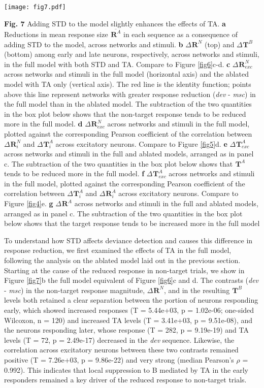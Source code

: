 \documentclass[pdflatex,referee,iicol,sn-basic]{sn-jnl}
\newcommand{\dev}{\textit{dev}}
\newcommand{\msc}{\textit{msc}}
\renewcommand{\R}[3][]{{}^{#1}_{}\!\mathbf{R}^{#2}_{#3}}
\renewcommand{\T}[3][]{{}^{#1}_{}\mathbf{T}^{#2}_{#3}}
\newcommand{\mean}[1]{\overline{#1}}
\theoremstyle{thmstyleone}%
\theoremstyle{thmstyletwo}%
\theoremstyle{thmstylethree}%
\begin{document}
\begin{figure*}%
    \centering
    \texttt{[image: fig7.pdf]}
    \caption{}
    \label{fig7}
\end{figure*}
\textbf{Fig. 7} Adding STD to the model slightly enhances the effects of TA.
\textbf{a} Reductions in mean response size $\mean{\R{A}{}}$ in each sequence as a consequence of adding STD to the model, across networks and stimuli.
\textbf{b} $\Delta \R{N}{}$ (top) and $\Delta \T{B}{}$ (bottom) among early and late neurons, respectively, across networks and stimuli, in the full model with both STD and TA. Compare to Figure \ref{fig6}c-d.
\textbf{c} $\Delta \R{N}{exc}$ across networks and stimuli in the full model (horizontal axis) and the ablated model with TA only (vertical axis). The red line is the identity function; points above this line represent networks with greater response reduction (\dev{} - \msc{}) in the full model than in the ablated model. The subtraction of the two quantities in the box plot below shows that the non-target response tends to be reduced more in the full model.
\textbf{d} $\Delta \R{N}{exc}$ across networks and stimuli in the full model, plotted against the corresponding Pearson coefficient of the correlation between $\Delta \R{N}{i}$ and $\Delta \T{A}{i}$ across excitatory neurons. Compare to Figure \ref{fig5}d.
\textbf{e} $\Delta \T{A}{exc}$ across networks and stimuli in the full and ablated models, arranged as in panel c. The subtraction of the two quantities in the box plot below shows that $\T{A}{}$ tends to be reduced more in the full model.
\textbf{f} $\Delta \T{A}{exc}$ across networks and stimuli in the full model, plotted against the corresponding Pearson coefficient of the correlation between $\Delta \T{A}{i}$ and $\Delta \R{A}{i}$ across excitatory neurons. Compare to Figure \ref{fig4}e.
\textbf{g} $\Delta \R{A}{}$ across networks and stimuli in the full and ablated models, arranged as in panel c. The subtraction of the two quantities in the box plot below shows that the target response tends to be increased more in the full model

To understand how STD affects deviance detection and causes this difference in response reduction, we first examined the effects of TA in the full model, following the analysis on the ablated model laid out in the previous section. Starting at the cause of the reduced response in non-target trials, we show in Figure \ref{fig7}b the full model equivalent of Figure \ref{fig6}c and d. The contrasts (\dev{} - \msc{}) in the non-target response magnitude, $\Delta \R{N}{}$, and in the resulting $\T{B}{}$ levels both retained a clear separation between the portion of neurons responding early, which showed increased responses (T = 5.44e+03, p = 1.02e-06; one-sided Wilcoxon, n = 120) and increased TA levels (T = 3.41e+03, p = 9.51e-08), and the neurons responding later, whose response (T = 282, p = 9.19e-19) and TA levels (T = 72, p = 2.49e-17) decreased in the \dev{} sequence. Likewise, the correlation across excitatory neurons between these two contrasts remained positive (T = 7.26e+03, p = 9.86e-22) and very strong (median Pearson's $\rho$ = 0.992). This indicates that local suppression to B mediated by TA in the early responders remained a key driver of the reduced response to non-target trials.
\end{document}
